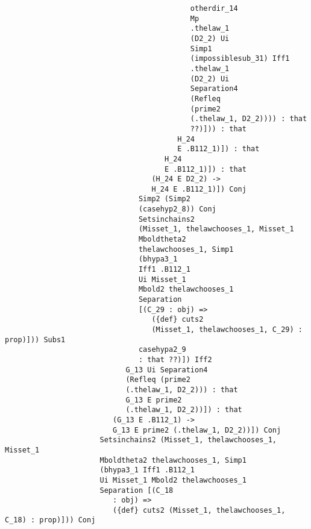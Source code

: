 \documentclass[12pt]{article}
\begin{document}
\begin{verbatim}
                                           otherdir_14 
                                           Mp 
                                           .thelaw_1 
                                           (D2_2) Ui 
                                           Simp1 
                                           (impossiblesub_31) Iff1 
                                           .thelaw_1 
                                           (D2_2) Ui 
                                           Separation4 
                                           (Refleq 
                                           (prime2 
                                           (.thelaw_1, D2_2)))) : that 
                                           ??)])) : that 
                                        H_24 
                                        E .B112_1)]) : that 
                                     H_24 
                                     E .B112_1)]) : that 
                                  (H_24 E D2_2) -> 
                                  H_24 E .B112_1)]) Conj 
                               Simp2 (Simp2 
                               (casehyp2_8)) Conj 
                               Setsinchains2 
                               (Misset_1, thelawchooses_1, Misset_1 
                               Mboldtheta2 
                               thelawchooses_1, Simp1 
                               (bhypa3_1 
                               Iff1 .B112_1 
                               Ui Misset_1 
                               Mbold2 thelawchooses_1 
                               Separation 
                               [(C_29 : obj) => 
                                  ({def} cuts2 
                                  (Misset_1, thelawchooses_1, C_29) : prop)])) Subs1 
                               casehypa2_9 
                               : that ??)]) Iff2 
                            G_13 Ui Separation4 
                            (Refleq (prime2 
                            (.thelaw_1, D2_2))) : that 
                            G_13 E prime2 
                            (.thelaw_1, D2_2))]) : that 
                         (G_13 E .B112_1) -> 
                         G_13 E prime2 (.thelaw_1, D2_2))]) Conj 
                      Setsinchains2 (Misset_1, thelawchooses_1, Misset_1 
                      Mboldtheta2 thelawchooses_1, Simp1 
                      (bhypa3_1 Iff1 .B112_1 
                      Ui Misset_1 Mbold2 thelawchooses_1 
                      Separation [(C_18 
                         : obj) => 
                         ({def} cuts2 (Misset_1, thelawchooses_1, C_18) : prop)])) Conj 

\end{verbatim}
\end{document}
